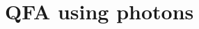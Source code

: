 \documentclass[aspectratio=169,9pt]{beamer}
\begin{document}



\section{QFA using photons}
\end{document}
